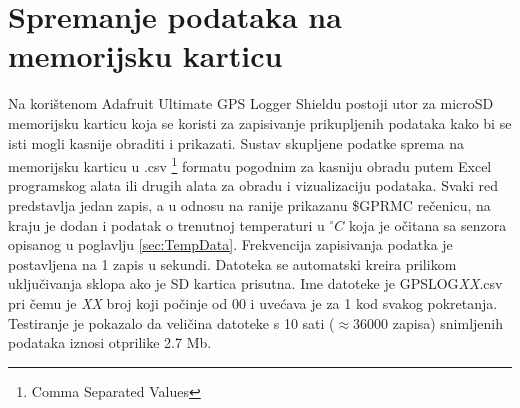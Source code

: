 \section{Spremanje podataka na memorijsku karticu}
Na korištenom Adafruit Ultimate GPS Logger Shieldu postoji utor za microSD memorijsku karticu koja se koristi za zapisivanje prikupljenih podataka kako bi se isti mogli kasnije obraditi i prikazati.
Sustav skupljene podatke sprema na memorijsku karticu u .csv \footnote{Comma Separated Values} formatu pogodnim za kasniju obradu putem Excel programskog alata ili drugih alata za obradu i vizualizaciju podataka.
Svaki red predstavlja jedan zapis, a u odnosu na ranije prikazanu \$GPRMC rečenicu, na kraju je dodan i podatak o trenutnoj temperaturi u $^\circ C$ koja je očitana sa senzora opisanog u poglavlju \ref{sec:TempData}.
Frekvencija zapisivanja podatka je postavljena na 1 zapis u sekundi.
Datoteka se automatski kreira prilikom uključivanja sklopa ako je SD kartica prisutna.
Ime datoteke je GPSLOG\textit{XX}.csv pri čemu je \textit{XX} broj koji počinje od 00 i uvećava je za 1 kod svakog pokretanja. 
Testiranje je pokazalo da veličina datoteke s 10 sati ($\approx 36000$ zapisa) snimljenih podataka iznosi otprilike 2.7 Mb.
